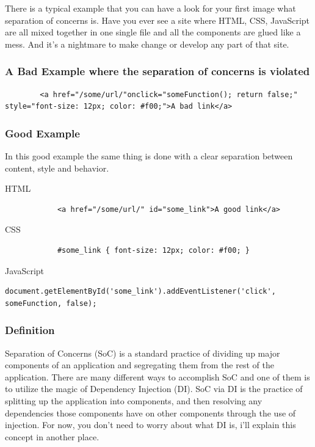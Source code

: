 \documentclass[14pt,a4paper]{extreport}
\begin{document}
There is a typical example that you can have a look for your first image what separation of concerns is. Have you ever see a site where HTML, CSS, JavaScript are all mixed together in one single file and all the components are glued like a mess. And it’s a nightmare to make change or develop any part of that site.
	\subsubsection{A Bad Example where the separation of concerns is violated}
	\begin{verbatim}
		<a href="/some/url/"onclick="someFunction(); return false;" style="font-size: 12px; color: #f00;">A bad link</a>
	\end{verbatim}
	\subsubsection{Good Example}
	In this good example the same thing is done with a clear separation between content, style and behavior.
	\begin{list}{•}{•}
		\item HTML
		\begin{verbatim}
			<a href="/some/url/" id="some_link">A good link</a>
		\end{verbatim}
		\item CSS
		\begin{verbatim}
			#some_link { font-size: 12px; color: #f00; }
		\end{verbatim}				
		\item JavaScript
		\begin{verbatim}
document.getElementById('some_link').addEventListener('click', someFunction, false);		
		\end{verbatim}
	\end{list}
			\subsubsection{Definition}
Separation of Concerns (SoC)  is a standard practice of dividing up major components of an application and segregating them from the rest of the application. There are many different ways to accomplish SoC and one of them is to utilize the magic of Dependency Injection (DI). SoC via DI is the practice of splitting up the application into components, and then resolving any dependencies those components have on other components through the use of injection. For now, you don’t need to worry about what DI is, i’ll explain this concept in another place.
\end{document}
